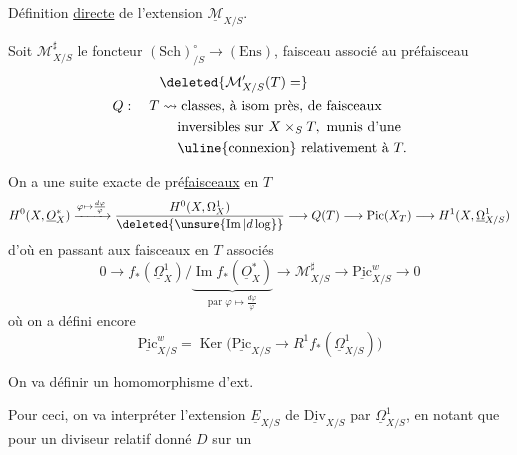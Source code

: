 \noindent Définition \uline{directe} de l'extension $\underline{\mathcal M}_{X/S}$.

Soit $\mathcal M^\sharp_{X/S}$ le foncteur $(\mathrm{Sch})_{/S}^{\circ}\longrightarrow(\mathrm{Ens})$, faisceau  associé au préfaisceau
\[
\begin{aligned}
 &\deleted{\mathcal M'_{X/S}(T)=}\\
 Q:\quad T&\rightsquigarrow \text{classes, à isom près, de faisceaux}\\
 &\phantom{\rightsquigarrow{}}\text{inversibles sur }X\times_S T,\text{ munis d'une}\\
 &\phantom{\rightsquigarrow{}}\text{\uline{connexion} relativement à }T.
\end{aligned}
\]

  On a une suite exacte de pré\uline{faisceaux} en $T$
\[
 H^0(X,\underline O_X^*)\xrightarrow{\varphi\mapsto\frac{d\varphi}{\varphi}}
 \frac{H^0(X,\Omega^1_X)}{\deleted{\unsure{\operatorname{Im}|d\log}}}
 \longrightarrow Q(T)\longrightarrow\mathrm{Pic}(X_T)\longrightarrow H^1(X,\underline\Omega^1_{X/S})
\]
d'où en passant aux faisceaux en $T$ associés
\[
 0\longrightarrow f_*(\underline\Omega^1_X)/\underbrace{\operatorname{Im}f_*(\underline O_X^*)}_{\text{par }\varphi\mapsto\frac{d\varphi}{\varphi}}
 \longrightarrow\mathcal M^\sharp_{X/S}\longrightarrow\underline{\mathrm{Pic}}^{w}_{X/S}\longrightarrow0
\]
où on a défini encore
\[
 \underline{\mathrm{Pic}}^w_{X/S}=\operatorname{Ker}\bigl(\underline{\mathrm{Pic}}_{X/S}\longrightarrow R^1 f_*(\underline\Omega^1_{X/S})\bigr)
\]

On va définir un homomorphisme d'ext.

Pour ceci, on va interpréter  l'extension $\underline E_{X/S}$ de $\underline{\mathrm{Div}}_{X/S}$ par $\underline\Omega^1_{X/S}$, en notant que pour un diviseur relatif donné $D$ sur un

